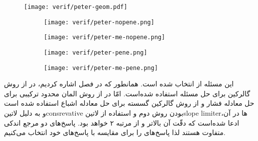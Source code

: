 \begin{figure}
\texttt{[image: verif/peter-geom.pdf]} 
\label{fig:4peterprob} \vspace{1cm}
\begin{subfigure}{0.5\textwidth}
\texttt{[image: verif/peter-nopene.png]} 
\end{subfigure}
\begin{subfigure}{0.5\textwidth}
\texttt{[image: verif/peter-me-nopene.png]}
\end{subfigure}
\begin{subfigure}{0.5\textwidth}
\texttt{[image: verif/peter-pene.png]} 
\label{fig:4peterres-him}
\end{subfigure}
\begin{subfigure}{0.5\textwidth}
\texttt{[image: verif/peter-me-pene.png]} 
\label{fig:4peterres-me}
\end{subfigure}
\label{fig:4peterres}
\end{figure}

این مسئله از  انتخاب شده است. همانطور که در فصل  اشاره کردیم، در  از روش گالرکین برای حل مسئله استفاده شده‌است. امّا در  از روش المان محدود ترکیبی برای حل معادله فشار و از روش گالرکین گسسته برای حل معادله اشباع استفاده شده است و به دلیل ‌لاتین{consrevative} بودن روش دوم و استفاده از ‌لاتین{slope limiter}ها در آن، ادعا شده‌است که دقّت آن بالاتر و از مرتبه ۲ خواهد بود. پاسخ‌های دو مرجع اندکی متفاوت هستند لذا پاسخ‌های  را برای مقایسه با پاسخ‌های خود انتخاب می‌کنیم.

